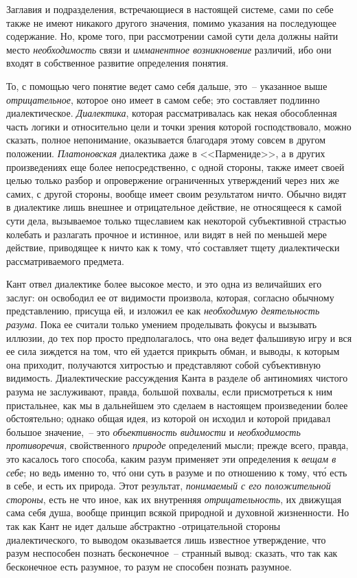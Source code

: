 Заглавия и подразделения, встречающиеся в настоящей
системе, сами по себе также не имеют никакого другого
значения, помимо указания на последующее содержание.
Но, кроме того, при рассмотрении самой сути дела
должны найти место \emph{необходимость} связи и \emph{имманентное
возникновение} различий, ибо они входят в собственное
развитие определения понятия.

То, с помощью чего понятие ведет само себя дальше,
это~-- указанное выше \emph{отрицательное}, которое оно имеет
в самом себе; это составляет подлинно диалектическое.
\emph{Диалектика}, которая рассматривалась как некая обособленная
часть логики и относительно цели и точки зрения
которой господствовало, можно сказать, полное
непонимание, оказывается благодаря этому совсем в другом
положении. \emph{Платоновская} диалектика даже в <<Пармениде>>,
а в других произведениях еще более непосредственно,
с одной стороны, также имеет своей целью
только разбор и опровержение ограниченных утверждений
через них же самих, с другой стороны, вообще имеет
своим результатом ничто. Обычно видят в диалектике
лишь внешнее и отрицательное действие, не относящееся
к самой сути дела, вызываемое только тщеславием
как некоторой субъективной страстью колебать и разлагать
прочное и истинное, или видят в ней по меньшей
мере действие, приводящее к ничто как к тому, чт\'о составляет
тщету диалектически рассматриваемого предмета.

Кант отвел диалектике более высокое место, и это
одна из величайших его заслуг: он освободил ее от видимости
произвола, которая, согласно обычному представлению,
присуща ей, и изложил ее как \emph{необходимую деятельность
разума}. Пока ее считали только умением проделывать
фокусы и вызывать иллюзии, до тех пор просто
предполагалось, что она ведет фальшивую игру и вся
ее сила зиждется на том, что ей удается прикрыть обман,
и выводы, к которым она приходит, получаются хитростью
и представляют собой субъективную видимость.
Диалектические рассуждения Канта в разделе об антиномиях
чистого разума не заслуживают, правда, большой
похвалы, если присмотреться к ним пристальнее, как мы
в дальнейшем это сделаем в настоящем произведении
более обстоятельно; однако общая идея, из которой он
исходил и которой придавал большое значение,~-- это
\emph{объективность видимости} и \emph{необходимость противоречия},
свойственного \emph{природе} определений мысли; прежде всего,
правда, это касалось того способа, каким разум применяет
эти определения к \emph{вещам в себе}; но ведь именно то,
чт\'о они суть в разуме и по отношению к тому, чт\'о есть
в себе, и есть их природа. Этот результат, \emph{понимаемый
с его положительной стороны}, есть не что иное, как их
внутренняя \emph{отрицательность}, их движущая сама себя
душа, вообще принцип всякой природной и духовной
жизненности. Но так как Кант не идет дальше абстрактно
-отрицательной стороны диалектического, то выводом
оказывается лишь известное утверждение, что разум неспособен
познать бесконечное~-- странный вывод: сказать,
что так как бесконечное есть разумное, то разум
не способен познать разумное.

